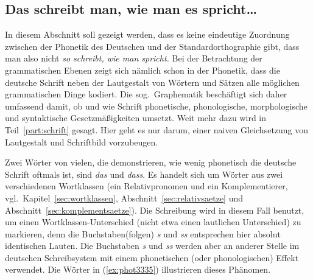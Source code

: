 
\subsection{Das schreibt man, wie man es spricht\ldots}

\label{sec:schriftlaut}
\label{sec:unphonetischeschreibungen}


In diesem Abschnitt soll gezeigt werden, dass es keine eindeutige Zuordnung zwischen der Phonetik des Deutschen und der Standardorthographie gibt, dass man also nicht \textit{so schreibt, wie man spricht.}
Bei der Betrachtung der grammatischen Ebenen zeigt sich nämlich schon in der Phonetik, dass die deutsche Schrift neben der Lautgestalt von Wörtern und Sätzen alle möglichen grammatischen Dinge kodiert.
Die sog.\ Graphematik beschäftigt sich daher umfassend damit, ob und wie Schrift phonetische, phonologische, morphologische und syntaktische Gesetzmäßigkeiten umsetzt.
Weit mehr dazu wird in Teil~\ref{part:schrift} gesagt.
Hier geht es nur darum, einer naiven Gleichsetzung von Lautgestalt und Schriftbild vorzubeugen.

Zwei Wörter von vielen, die demonstrieren, wie wenig phonetisch die deutsche Schrift oftmals ist, sind \textit{das} und \textit{dass}.
Es handelt sich um Wörter aus zwei verschiedenen Wortklassen (ein Relativpronomen und ein Komplementierer, vgl.\ Kapitel~\ref{sec:wortklassen}, Abschnitt~\ref{sec:relativsaetze} und Abschnitt~\ref{sec:komplementsaetze}).
Die Schreibung wird in diesem Fall benutzt, um einen Wortklassen-Unterschied (nicht etwa einen lautlichen Unterschied) zu markieren, denn die Buchstaben(folgen) \textit{s} und \textit{ss} entsprechen hier absolut identischen Lauten.
Die Buchstaben \textit{s} und \textit{ss} werden aber an anderer Stelle im deutschen Schreibsystem mit einem phonetischen (oder phonologischen) Effekt verwendet.
Die Wörter in (\ref{ex:phot3335}) illustrieren dieses Phänomen.

\begin{exe}
  \ex\label{ex:phot3335}
  \begin{xlist}
  \end{xlist}
\end{exe}

